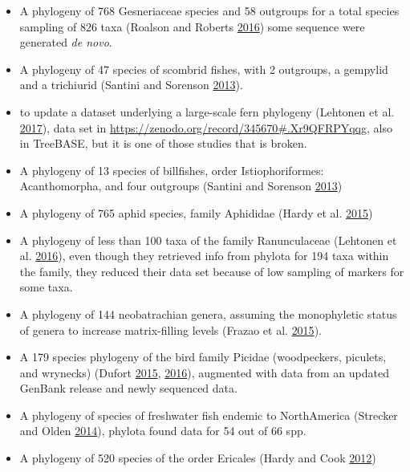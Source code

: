 \documentclass[]{article}
\providecommand{\tightlist}{%
  \setlength{\itemsep}{0pt}\setlength{\parskip}{0pt}}
\begin{document}
\begin{enumerate}
  \begin{itemize}
  \tightlist
  \item
    A phylogeny of 768 Gesneriaceae species and 58 outgroups for a total species
    sampling of 826 taxa (Roalson and Roberts \protect\hyperlink{ref-roalson2016distinct}{2016}) some sequence were generated \emph{de novo}.
  \item
    A phylogeny of 47 species of scombrid fishes, with 2 outgroups, a gempylid and
    a trichiurid (Santini and Sorenson \protect\hyperlink{ref-santini2013first}{2013}).
  \item
    to update a dataset underlying a large-scale fern phylogeny (Lehtonen et al. \protect\hyperlink{ref-lehtonen2017environmentally}{2017}),
    data set in \url{https://zenodo.org/record/345670\#.Xr9QFRPYqqg}, also in TreeBASE,
    but it is one of those studies that is broken.
  \item
    A phylogeny of 13 species of billfishes, order Istiophoriformes: Acanthomorpha,
    and four outgroups (Santini and Sorenson \protect\hyperlink{ref-santini2013first}{2013})
  \item
    A phylogeny of 765 aphid species, family Aphididae (Hardy et al. \protect\hyperlink{ref-hardy2015evolution}{2015})
  \item
    A phylogeny of less than 100 taxa of the family Ranunculaceae (Lehtonen et al. \protect\hyperlink{ref-lehtonen2016sensitive}{2016}),
    even though they retrieved info from phylota for 194 taxa within the family, they
    reduced their data set because of low sampling of markers for some taxa.
  \item
    A phylogeny of 144 neobatrachian genera, assuming the monophyletic status of
    genera to increase matrix-filling levels (Frazao et al. \protect\hyperlink{ref-frazao2015gondwana}{2015}).
  \item
    A 179 species phylogeny of the bird family Picidae (woodpeckers, piculets,
    and wrynecks) (Dufort \protect\hyperlink{ref-dufort2015coexistence}{2015}, \protect\hyperlink{ref-dufort2016augmented}{2016}), augmented with data from an updated GenBank
    release and newly sequenced data.
  \item
    A phylogeny of species of freshwater fish endemic to NorthAmerica (Strecker and Olden \protect\hyperlink{ref-strecker2014fish}{2014}),
    phylota found data for 54 out of 66 spp.
  \item
    A phylogeny of 520 species of the order Ericales (Hardy and Cook \protect\hyperlink{ref-hardy2012testing}{2012})

\end{itemize}
\end{enumerate}
\end{document}
